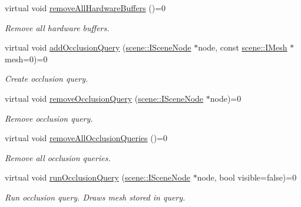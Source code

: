 \begin{DoxyCompactItemize}
\mbox{\label{classirr_1_1video_1_1IVideoDriver_a2538b3163d6e072f5b3deb905cb2abb0}} 
virtual void \hyperlink{classirr_1_1video_1_1IVideoDriver_a2538b3163d6e072f5b3deb905cb2abb0}{remove\+All\+Hardware\+Buffers} ()=0
\begin{DoxyCompactList}\small\item\em Remove all hardware buffers. \end{DoxyCompactList}\item 
virtual void \hyperlink{classirr_1_1video_1_1IVideoDriver_a07f15814e039772ee43be272e97d1633}{add\+Occlusion\+Query} (\hyperlink{classirr_1_1scene_1_1ISceneNode}{scene\+::\+I\+Scene\+Node} $\ast$node, const \hyperlink{classirr_1_1scene_1_1IMesh}{scene\+::\+I\+Mesh} $\ast$mesh=0)=0
\begin{DoxyCompactList}\small\item\em Create occlusion query. \end{DoxyCompactList}\item 
\mbox{\label{classirr_1_1video_1_1IVideoDriver_a9f7d9cec8356edf3e16e264e476d849a}} 
virtual void \hyperlink{classirr_1_1video_1_1IVideoDriver_a9f7d9cec8356edf3e16e264e476d849a}{remove\+Occlusion\+Query} (\hyperlink{classirr_1_1scene_1_1ISceneNode}{scene\+::\+I\+Scene\+Node} $\ast$node)=0
\begin{DoxyCompactList}\small\item\em Remove occlusion query. \end{DoxyCompactList}\item 
\mbox{\label{classirr_1_1video_1_1IVideoDriver_a5d77478ed4e0896fd2fd8b8d042dc1ff}} 
virtual void \hyperlink{classirr_1_1video_1_1IVideoDriver_a5d77478ed4e0896fd2fd8b8d042dc1ff}{remove\+All\+Occlusion\+Queries} ()=0
\begin{DoxyCompactList}\small\item\em Remove all occlusion queries. \end{DoxyCompactList}\item 
virtual void \hyperlink{classirr_1_1video_1_1IVideoDriver_aaf92a35268dad06996c4f5edabec249f}{run\+Occlusion\+Query} (\hyperlink{classirr_1_1scene_1_1ISceneNode}{scene\+::\+I\+Scene\+Node} $\ast$node, bool visible=false)=0
\begin{DoxyCompactList}\small\item\em Run occlusion query. Draws mesh stored in query. \end{DoxyCompactList}\item 

\end{DoxyCompactItemize}
